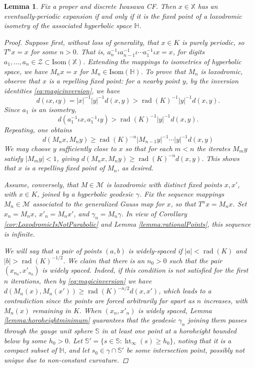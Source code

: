 \documentclass[reqno,10pt]{amsart}
\newcommand{\Hyp}{\mathbb{H}}
\newcommand{\height}{\operatorname{ht}}
\newcommand{\X}{\mathbb X}
\newcommand{\norm}[1]{\left\vert #1 \right \vert}
\newcommand{\Isom}{\text{Isom}}
\newcommand{\rad}{\operatorname{rad}}
\newtheorem{lemma}[thm]{Lemma}
\numberwithin{thm}{section}
\theoremstyle{definition}
\theoremstyle{definition}
\numberwithin{equation}{section}
\newcommand{\Mod}{\mathcal M}
\newcommand{\Zee}{\mathcal Z}
\newcommand{\Sph}{\mathbb S}
\begin{document}
\begin{lemma}Fix a proper and discrete Iwasawa CF. Then $x\in \X$ has an eventually-periodic expansion if and only if it is the fixed point of a loxodromic isometry of the associated hyperbolic space $\Hyp$.
\begin{proof}
Suppose first, without loss of generality, that $x\in K$ is purely periodic, so $T^n x= x$ for some $n>0$. That is, $a_n^{-1} \iota a^{-1}_{n-1} \iota \cdots a_1^{-1} \iota x = x$, for digits $a_1, \ldots, a_n\in \Zee \subset \Isom(\X)$. Extending the mappings to isometries of hyperbolic space, we have $M_n x = x$ for $M_n\in \Isom(\Hyp)$. To prove that $M_n$ is loxodromic, observe that $x$ is a repelling fixed point: for a nearby point $y$, by the inversion identities \eqref{eq:magicinversion}, we have 
$$d(\iota x, \iota y) = \norm{x}^{-1}\norm{y}^{-1} d(x,y) > \rad(K)^{-1} \norm{y}^{-1} d(x,y).$$
Since $a_1$ is an isometry,
$$d(a_1^{-1} \iota x, a_1^{-1}\iota y) > \rad(K)^{-1} \norm{y}^{-1}  d(x,y).$$
Repeating, one obtains
$$d(M_n x, M_n y) \geq \rad(K)^{-n}\norm{M_{n-1} y}^{-1}\cdots \norm{y}^{-1} d(x,y)$$
We may choose $y$ sufficiently close to $x$ so that for each $m<n$ the iterates $M_my$ satisfy $\norm{M_my}<1$, giving $d(M_nx, M_ny)\geq \rad(K)^{-n}d(x,y)$. This shows that $x$ is a repelling fixed point of $M_n$, as desired. 

Assume, conversely, that $M\in \Mod$ is loxodromic with distinct fixed points $x, x'$, with $x\in K$, joined by a hyperbolic geodesic $\gamma$.  Fix the sequence mappings $M_n\in \Mod$ associated to the generalized Gauss map for $x$, so that $T^n x = M_n x$. Set $x_n = M_n x$, $x'_n = M_n x'$, and $\gamma_n = M_n \gamma$. In view of Corollary \ref{cor:LoxodromicIsNotParabolic} and Lemma \ref{lemma:rationalPoints}, this sequence is infinite.

We will say that a pair of points $(a,b)$ is \emph{widely-spaced} if $\norm{a}<\rad(K)$ and $\norm{b}>\rad(K)^{-1/2}$. We claim that there is an $n_0>0$ such that the pair $(x_{n_0}, x'_{n_0})$ is widely spaced. Indeed, if this condition is not satisfied for the first $n$ iterations, then by \eqref{eq:magicinversion} we have $d(M_n(x), M_n(x'))\geq \rad(K)^{-n/2}d(x,x')$, which leads to a contradiction since the points are forced arbitrarily far apart as $n$ increases, with $M_n(x)$ remaining in $K$. When $(x_n, x'_n)$ is widely spaced, Lemma \ref{lemma:horoheightminimum} guarantees that the geodesic $\gamma_n$ joining them passes through the gauge unit sphere $\mathbb S$ in at least one point at a horoheight bounded below by some $h_0>0$. Let $\Sph' = \{ s\in \mathbb S : \height_\infty(s)\geq h_0\}$, noting that it is a compact subset of $\Hyp$, and let $s_0 \in \gamma \cap \Sph'$ be some intersection point, possibly not unique due to non-constant curvature. 


\end{proof}
\end{lemma}
\end{document}

